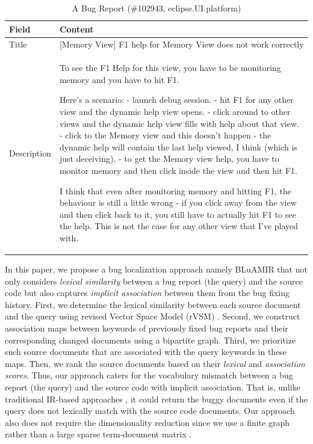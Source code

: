 \documentclass[conference]{IEEEtran}
\begin{document}
\begin{table}[!tb]
	\caption{A Bug Report (\#102943, eclipse.UI.platform)}
	\label{tab:BugInfo}
	\vspace{-.4cm}
	\begin{center}
		\begin{tabular}{ p{1.5cm} | p{6cm}}
			\hline
			\textbf{Field}  & \textbf{Content} \\
			\hline
			\hline
			Title & [Memory View] F1 help for Memory View does not work correctly
			\\
			\hline
			Description &  
		To see the F1 Help for this view, you have to be monitoring memory and you have
		to hit F1.
		
		Here's a scenario:
		- launch debug session.
		- hit F1 for any other view and the dynamic help view opens.
		- click around to other views and the dynamic help view fills with help about
		that view.
		- click to the Memory view and this doesn't happen - the dynamic help will
		contain the last help viewed, I think (which is just deceiving).
		- to get the Memory view help, you have to monitor memory and then click inside
		the view and then hit F1.
		
		I think that even after monitoring memory and hitting F1, the behaviour is still
		a little wrong - if you click away from the view and then click back to it, you
		still have to actually hit F1 to see the help. This is not the case for any
		other view that I've played with.\\
			\hline
		\end{tabular}
	\end{center}
\end{table}


In this paper, we propose a bug localization approach namely BLuAMIR that not only considers \emph{lexical similarity} between a bug report (the query) and the source code but also captures \emph{implicit association} between them from the bug fixing history. First, we determine the lexical similarity between each source document and the query using revised Vector Space Model (rVSM) \cite{Jian}.
Second, we construct association maps between keywords of previously fixed bug reports and their corresponding changed documents using a bipartite graph. Third, we prioritize such source documents that are associated with the query keywords in these maps. Then, we rank the source documents based on their \emph{lexical} and \emph{association scores}.
Thus, our approach caters for the vocabulary mismatch between a bug report (the query) and the source code with implicit association. 
That is, unlike traditional IR-based approaches \cite{Jian,Saha}, it could return the buggy documents even if the query does not lexically match with the source code documents. Our approach also does not require the dimensionality reduction since we use a finite graph rather than a large sparse term-document matrix \cite{MarcusLSI,MarcusMaletic}.
\end{document}
